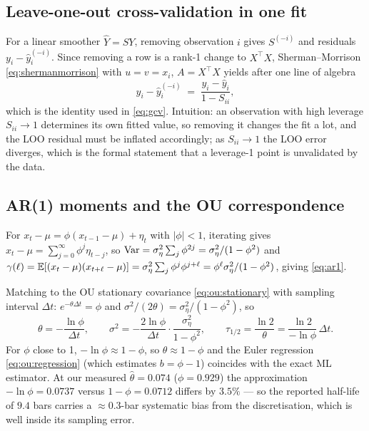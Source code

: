 \subsection{Leave-one-out cross-validation in one fit}
\label{sec:der:loo}

For a linear smoother $\hat Y=SY$, removing observation $i$ gives
$S^{(-i)}$ and residuals $y_i-\hat y_i^{(-i)}$. Since removing a row is a rank-1 change to
$X^{\top}X$, Sherman--Morrison \eqref{eq:shermanmorrison} with
$u=v=x_i$, $A=X^{\top}X$ yields after one line of algebra
\begin{equation}
  y_i-\hat y_i^{(-i)} \;=\; \frac{y_i-\hat y_i}{1-S_{ii}},
  \label{eq:looidentity}
\end{equation}
which is the identity used in \eqref{eq:gcv}. Intuition: an observation with high leverage
$S_{ii}\to1$ determines its own fitted value, so removing it changes the fit a lot, and the
LOO residual must be inflated accordingly; as $S_{ii}\to1$ the LOO error diverges, which is
the formal statement that a leverage-1 point is unvalidated by the data.

\subsection{AR(1) moments and the OU correspondence}
\label{sec:der:ar1}

For $x_t-\mu=\phi(x_{t-1}-\mu)+\eta_t$ with $\lvert\phi\rvert<1$, iterating gives
$x_t-\mu=\sum_{j=0}^{\infty}\phi^j\eta_{t-j}$, so
$\operatorname{Var}=\sigma_\eta^2\sum_j\phi^{2j}=\sigma_\eta^2/(1-\phi^2)$ and
$\gamma(\ell)=\mathbb{E}[(x_t-\mu)(x_{t+\ell}-\mu)]=\sigma_\eta^2\sum_j\phi^j\phi^{j+\ell}
=\phi^{\ell}\sigma_\eta^2/(1-\phi^2)$, giving \eqref{eq:ar1}.

Matching to the OU stationary covariance \eqref{eq:ou:stationary} with sampling interval
$\Delta t$: $e^{-\theta\Delta t}=\phi$ and $\sigma^2/(2\theta)=\sigma_\eta^2/(1-\phi^2)$,
so
\begin{equation}
  \theta = -\frac{\ln\phi}{\Delta t},
  \qquad
  \sigma^2 = -\frac{2\ln\phi}{\Delta t}\cdot\frac{\sigma_\eta^2}{1-\phi^2},
  \qquad
  \tau_{1/2} = \frac{\ln2}{\theta} = \frac{\ln 2}{-\ln\phi}\,\Delta t .
  \label{eq:ar1ou}
\end{equation}
For $\phi$ close to 1, $-\ln\phi\approx1-\phi$, so $\theta\approx1-\phi$ and the Euler
regression \eqref{eq:ou:regression} (which estimates $b=\phi-1$) coincides with the exact
ML estimator. At our measured $\hat\theta=0.074$ ($\phi=0.929$) the approximation
$-\ln\phi=0.0737$ versus $1-\phi=0.0712$ differs by $3.5\%$ --- so the reported half-life
of $9.4$ bars carries a $\approx0.3$-bar systematic bias from the discretisation, which is
well inside its sampling error.

